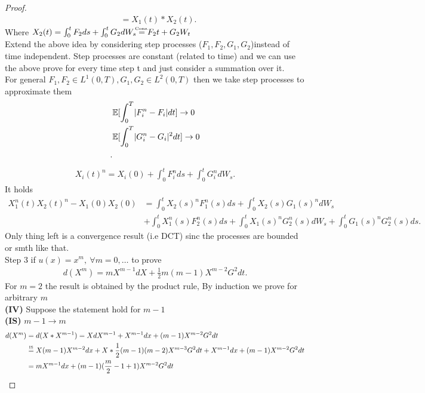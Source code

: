 \begin{proof}
\begin{align*}
   &= X_{1}(t)*X_{2}(t)
 .\end{align*}
 Where $X_{2}(t) = \int_0^{t} F_{2} ds + \int_0^{t}G_{2}dW_s   \myS{Cons.}{=} F_{2}t + G_{2}W_t$ \\[1ex]
 Extend the above idea by considering step processes ($F_{1},F_{2},G_{1},G_{2}$)instead of time independent.
 Step processes are constant (related to time) and we can use the above prove for every time step t and just consider
 a summation over it. \\
 For general $F_{1},F_{2} \in  L^{1}(0,T) , G_{1},G_{2} \in  L^2(0,T) $ then we take step processes
 to approximate them
 \begin{align*}
   &\mathbb{E}[\int_0^{T} \lvert F_{i}^{n} - F_{i}\rvert dt  ] \to  0 \\
   &\mathbb{E}[\int_0^{T} \lvert G_{i}^{n} - G_{i}\rvert^2 dt  ] \to  0 \\
 .\end{align*}
 \begin{align*}
  X_i(t)^{n} = X_i(0) + \int_0^{t} F_i^{n}    ds + \int_0^{t} G_i^{n}  dW_s
 .\end{align*}
 It holds 
 \begin{align*}
   X_{1}^{n}(t) X_{2}(t)^{n}   - X_1(0)X_{2}(0)  &= \int_0^{t} X_2(s)^{n}  F_1^{n}(s) ds + \int_0^{t} X_2(s)G_1(s)^{n}    dW_s \\
                                                 &+ \int_0^{t} X_1^{n}  (s) F_2^{n}(s) ds + \int_0^{t} X_1(s)^{n}G_2^{n}(s) dW_s + \int_0^{t} G_1(s)^{n}G_2^{n}(s) ds
 .\end{align*}
 Only thing left is a convergence result (i.e DCT) sinc the processes are bounded or smth like that. \\[1ex]
 Step 3 if $u(x) = x^{m} , \ \forall  m=0,\ldots$  to prove 
 \begin{align*}
  d(X^{m} ) = mX^{m-1} dX + \frac{1}{2}m(m-1) X^{m-2} G^2dt
 .\end{align*}
 For $m=2$ the result is obtained by the product rule, By induction we prove for arbitrary $m$ \\[1ex]
 \textbf{(IV)} Suppose the statement hold for $m-1$ \\
 \textbf{(IS)} $m-1 \to  m$
 \begin{align*}
   d(X^{m} ) &= d(X*X^{m-1} ) = XdX^{m-1}  + X^{m-1} dx + (m-1)X^{m-2} G^2 dt\\
             &\myS{IS}{=} X(m-1)X^{m-2}  dx + X*\frac{1}{2}(m-1)(m-2)X^{m-3}G^2dt +X^{m-1} dx + (m-1)X^{m-2}G^2 dt  \\
             &= mX^{m-1} dx + (m-1)(\frac{m}{2}-1+1)X^{m-2}G^2   dt \\

\end{align*}
\end{proof}
